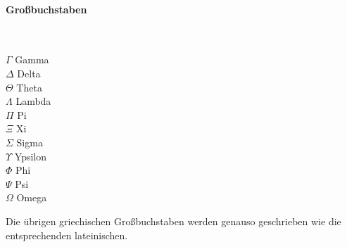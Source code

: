 \documentclass[fontsize=11pt, twoside=false, numbers=autoenddot]{scrbook}
\begin{document}

\paragraph*{Großbuchstaben}
~\par%
$\Gamma$ \dotfill Gamma \\
$\Delta$ \dotfill Delta \\
$\Theta$ \dotfill Theta \\
$\Lambda$ \dotfill Lambda \\
$\Pi$ \dotfill Pi \\
$\Xi$ \dotfill Xi \\
$\Sigma$ \dotfill Sigma \\
$\Upsilon$ \dotfill Ypsilon \\
$\Phi$ \dotfill Phi \\
$\Psi$ \dotfill Psi \\
$\Omega$ \dotfill Omega

Die übrigen griechischen Großbuchstaben werden genauso geschrieben wie die entsprechenden lateinischen.

\pagebreak
{}


\end{document}
